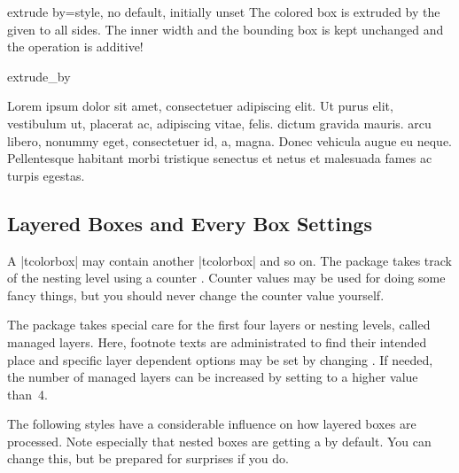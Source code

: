 \begin{docTcbKey}{extrude by}{=}{style, no default, initially unset}
  The colored box is extruded by the given  to all sides.
  The inner width and the bounding box is kept unchanged and the operation
  is additive!
\begin{exdispExample}{extrude_by}

Lorem ipsum dolor sit amet, consectetuer adipiscing elit. Ut purus elit,
vestibulum ut, placerat ac, adipiscing vitae, felis.  dictum
gravida mauris. 
arcu libero, nonummy eget, consectetuer id,  a, magna. Donec
vehicula augue eu neque. Pellentesque habitant morbi tristique senectus et netus
et malesuada fames ac turpis egestas. 
\end{exdispExample}
\end{docTcbKey}

\clearpage
\subsection{Layered Boxes and Every Box Settings}\label{subsec:everybox}
A |tcolorbox| may contain another |tcolorbox| and so on. The package
takes track of the nesting level using a counter . Counter values
may be used for doing some fancy things, but you should never change
the counter value yourself.

The package takes special care for the first four layers or nesting levels,
called managed layers.
Here, footnote texts are administrated to find their intended place
and specific layer dependent options may be set by changing
.
If needed, the number of managed layers can be increased by setting
 to a higher value than~4.

The following styles have a considerable influence on how layered boxes
are processed. Note especially that nested boxes are getting a
 by default. You can change this, but be prepared for
surprises if you do.

